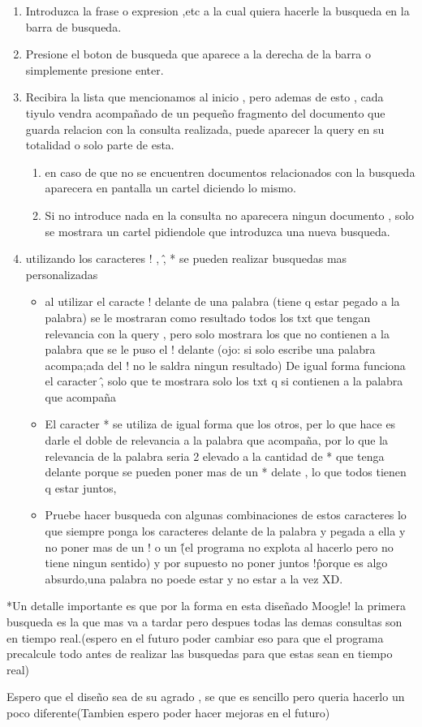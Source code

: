 \documentclass[a4paper,12pt]{article}
\begin{document}
\begin{enumerate}
    \item Introduzca la frase o expresion ,etc a la cual quiera hacerle la busqueda en la barra de 
    busqueda. 
    \item Presione el boton de busqueda que aparece a la derecha de la barra o simplemente presione enter.
    \item Recibira la lista que mencionamos al inicio , pero ademas de esto , cada tiyulo vendra acompañado 
    de un pequeño fragmento del documento que guarda relacion con la consulta realizada, puede aparecer la 
    query en su totalidad o solo parte de esta.
    
    \begin{enumerate}
        \item en caso de que no se encuentren documentos relacionados con la busqueda aparecera en pantalla 
        un cartel diciendo lo mismo.
        \item Si no introduce nada en la consulta no aparecera ningun documento , solo se mostrara un cartel 
        pidiendole que introduzca una nueva busqueda.
    \end{enumerate}
    \item utilizando los caracteres ! , \^ , * se pueden realizar busquedas mas personalizadas 
    \begin{itemize}
        \item al utilizar el caracte ! delante de una palabra (tiene q estar pegado a la palabra)
 se le mostraran como resultado todos los txt que tengan relevancia con la query , pero solo mostrara 
 los que no contienen a la palabra que se le puso el ! delante (ojo: si solo escribe una palabra acompa;ada del ! no le saldra ningun resultado)
 De igual forma funciona el caracter \^ , solo que te mostrara solo los txt q si contienen a la palabra que acompaña
        \item El caracter * se utiliza de igual forma que los otros, per lo que hace es darle el doble de relevancia a la 
 palabra que acompaña, por lo que la relevancia de la palabra seria 2 elevado a la cantidad de * que tenga delante
 porque se pueden poner mas de un * delate , lo que todos tienen q estar juntos,
        \item Pruebe hacer busqueda con algunas combinaciones de estos caracteres lo que siempre ponga los caracteres 
        delante de la palabra y pegada a ella y no poner mas de un ! o un \^ (el programa no explota al hacerlo pero 
        no tiene ningun sentido) y por supuesto no poner juntos !\^ porque es algo absurdo,una palabra no poede estar y no estar a la vez XD.  
    \end{itemize}
\end{enumerate}
*Un detalle importante es que por la forma en esta diseñado Moogle! la primera busqueda es la que mas va a tardar 
pero despues todas las demas consultas son en tiempo real.(espero en el futuro poder cambiar eso para que el programa 
precalcule todo antes de realizar las busquedas para que estas sean en tiempo real)

Espero que el diseño sea de su agrado , se que es sencillo pero queria hacerlo un poco diferente(Tambien espero poder hacer mejoras en el futuro)
\end{document}
